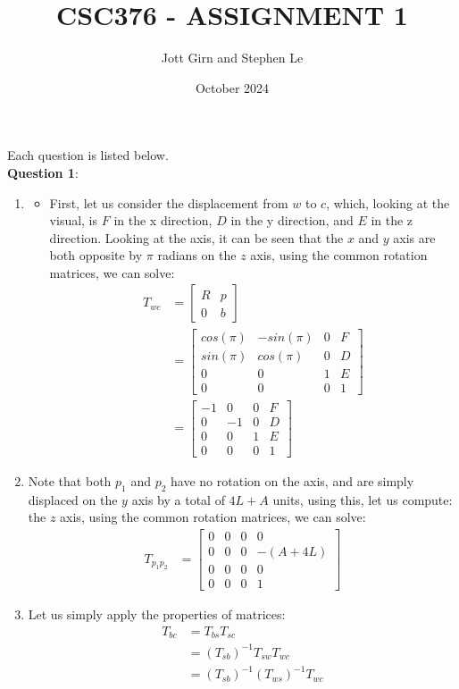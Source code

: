 \documentclass{article}
\title{CSC376 - ASSIGNMENT 1}
\author{Jott Girn and Stephen Le}
\date{October 2024}
\begin{document}
 \maketitle 
Each question is listed below.\\
\textbf{Question 1}:\\
\begin{enumerate}
    \item \begin{itemize}
        \item First, let us consider the displacement from $w$ to $c$, which, looking at the visual, is $F$ in the x direction, $D$ in the y direction, and $E$ in the z direction. Looking at the axis, it can be seen that the $x$ and $y$ axis are both opposite by $\pi$ radians on the $z$ axis, using the common rotation matrices, we can solve:
        \begin{align}
            T_{wc} &= \begin{bmatrix}
R & p \\
0 & b 
\end{bmatrix}\\
&= \begin{bmatrix}
cos(\pi) & -sin(\pi)& 0 & F \\
sin(\pi) & cos(\pi) & 0 & D \\
0 & 0 & 1& E \\
0 & 0 & 0 & 1
\end{bmatrix}\\
&= \begin{bmatrix}
-1 & 0& 0 & F \\
0 & -1 & 0 & D \\
0 & 0 & 1& E \\
0 & 0 & 0 & 1
\end{bmatrix}
        \end{align}
    \end{itemize}
    \item Note that both $p_1$ and $p_2$ have no rotation on the axis, and are simply displaced on the $y$ axis by a total of $4L+A$ units, using this, let us compute:
    the $z$ axis, using the common rotation matrices, we can solve:
        \begin{align}
            T_{p_1p_2} &= \begin{bmatrix}
0 & 0& 0 & 0 \\
0 & 0 & 0 & -(A+4L) \\
0 & 0 & 0& 0 \\
0 & 0 & 0 & 1
\end{bmatrix}
        \end{align}
        \item Let us simply apply the properties of matrices:
        \begin{align}
            T_{bc} &= T_{bs}T_{sc}\\
            &= (T_{sb})^{-1}T_{sw}T_{wc}\\
            &= (T_{sb})^{-1}(T_{ws})^{-1}T_{wc}
        \end{align}


\end{enumerate}
\end{document}
